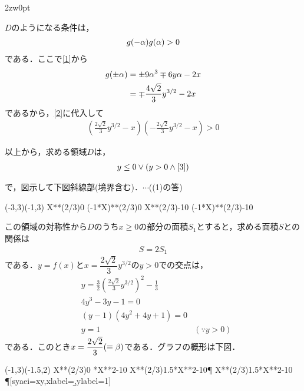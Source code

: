 \documentclass[a4j]{jarticle}
\begin{document}
\begin{multicols}{2}
\begin{indentation}{2zw}{0pt}
     
     $D$のようになる条件は，
          \begin{align}
          g(-\alpha)g(\alpha)>0\label{2}
          \end{align}
     である．ここで\eqref{1}から
          \begin{align*}
          g(\pm\alpha)&=\pm 9\alpha^3\mp 6y\alpha -2x \\
          &=\mp \frac{4\sqrt{2}}{3}y^{3/2}-2x
          \end{align*}
     であるから，\eqref{2}に代入して
          \begin{align}
          \left(\frac{2\sqrt{2}}{3}y^{3/2}-x\right)\left(-\frac{2\sqrt{2}}{3}y^{3/2}-x\right)>0\label{3}
          \end{align}
     \end{indentation}
     
以上から，求める領域$D$は，
     \begin{align}
     y\le0 \lor(y>0\land \eqref{3})
     \end{align}
     
で，図示して下図斜線部(境界含む)．$\cdots$((1)の答)

     \begin{zahyou}[ul=10mm](-3,3)(-1,3)
     \def\Fx{X**(2/3)}
     \def\Gx{(-1*X)**(2/3)}
     \def\Hx{-1}
     \YGurafu\Fx{0}{\xmax}
     \YGurafu\Gx{\xmin}{0}
     \YNurii*\Fx\Hx{0}{\xmax}
     \YNurii*\Gx\Hx{\xmin}{0}
     \end{zahyou}


この領域の対称性から$D$のうち$x\ge0$の部分の面積$S_1$とすると，求める面積$S$との関係は
     \begin{align}
     S=2S_1\label{4}
     \end{align}
である．$y=f(x)$と$x=\dfrac{2\sqrt{2}}{3}y^{3/2}$の$y>0$での交点は，
     \begin{align*}
     &y=\frac{3}{2}\left(\frac{2\sqrt{2}}{3}y^{3/2}\right)^2-\frac{1}{3} \\
     &4y^3-3y-1=0 \\
     &(y-1)(4y^2+4y+1)=0 \\
     &y=1&(\because y>0)
     \end{align*}
である．このとき$x=\dfrac{2\sqrt{2}}{3}(\equiv \beta)$である．グラフの概形は下図．\\

     \begin{zahyou}[ul=10mm](-1,3)(-1.5,2)
     \def\Fx{X**(2/3)}
     \def\Mx{1.5*X**2-1}
     \YGurafu\Fx{0}{\xmax}
     \YGurafu\Mx{0}{\xmax}
     \YKouten\Fx\Mx{0}{}\tempi\P
     \YNurii*\Fx\Mx{0}{\tempi}
     \Put\P[syaei=xy,xlabel=\b,ylabel=1]{}
     \end{zahyou}


\end{multicols}
\end{document}
